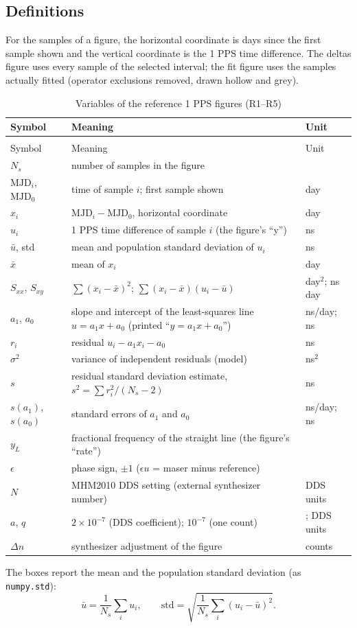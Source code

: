\documentclass[11pt,a4paper]{article}
\makeatletter
\renewcommand{\_}{\usscore\allowbreak}
\newenvironment{vartable}[2]{%
 \par\small\setlength{\LTpre}{3pt}\setlength{\LTpost}{3pt}%
 \begin{longtable}{@{}>{\raggedright}p{.2\linewidth}>{\raggedright}p{.57\linewidth}>{\raggedright\arraybackslash}p{.17\linewidth}@{}}
 \caption{#2}\label{#1}\\
 \toprule Symbol & Meaning & Unit\\\midrule
 \endfirsthead
 \multicolumn{3}{@{}l}{\footnotesize\itshape Table \thetable{} (continued)}\\
 \toprule Symbol & Meaning & Unit\\\midrule
 \endhead
 \bottomrule
 \endlastfoot}
 {\end{longtable}\normalsize}
\makeatother
\begin{document}
\subsection{Definitions}
For the samples of a figure, the horizontal coordinate is days since the first sample shown and the
vertical coordinate is the 1 PPS time difference. The deltas figure uses every sample of the selected
interval; the fit figure uses the samples actually fitted (operator exclusions removed, drawn hollow and
grey).
\begin{vartable}{tab:var-R}{Variables of the reference 1 PPS figures (R1--R5)}
\(N_s\) & number of samples in the figure & 1\\
\(\mathrm{MJD}_i\), \(\mathrm{MJD}_0\) & time of sample \(i\); first sample shown & day\\
\(x_i\) & \(\mathrm{MJD}_i-\mathrm{MJD}_0\), horizontal coordinate & day\\
\(u_i\) & 1 PPS time difference of sample \(i\) (the figure's ``y'') & ns\\
\(\bar u\), std & mean and population standard deviation of \(u_i\) & ns\\
\(\bar x\) & mean of \(x_i\) & day\\
\(S_{xx}\), \(S_{xy}\) & \(\sum(x_i-\bar x)^2\); \(\sum(x_i-\bar x)(u_i-\bar u)\) & day\(^2\); ns\,day\\
\(a_1\), \(a_0\) & slope and intercept of the least-squares line \(u=a_1x+a_0\) (printed ``\(y=a_1x+a_0\)'') & ns/day; ns\\
\(r_i\) & residual \(u_i-a_1x_i-a_0\) & ns\\
\(\sigma^2\) & variance of independent residuals (model) & ns\(^2\)\\
\(s\) & residual standard deviation estimate, \(s^2=\sum r_i^2/(N_s-2)\) & ns\\
\(s(a_1)\), \(s(a_0)\) & standard errors of \(a_1\) and \(a_0\) & ns/day; ns\\
\(y_L\) & fractional frequency of the straight line (the figure's ``rate'') & 1\\
\(\epsilon\) & phase sign, \(\pm1\) (\(\epsilon u\) = maser minus reference) & 1\\
\(N\) & MHM2010 DDS setting (external synthesizer number) & DDS units\\
\(a\), \(q\) & \(2\times10^{-7}\) (DDS coefficient); \(10^{-7}\) (one count) & 1; DDS units\\
\(\Delta n\) & synthesizer adjustment of the figure & counts\\
\end{vartable}
The boxes report the mean and the population standard deviation (as \texttt{numpy.std}):
\begin{equation}
\bar u=\frac1{N_s}\sum_i u_i,\qquad
\mathrm{std}=\sqrt{\frac1{N_s}\sum_i (u_i-\bar u)^2}. \tag{R1}\label{eq:R1}
\end{equation}
\end{document}
